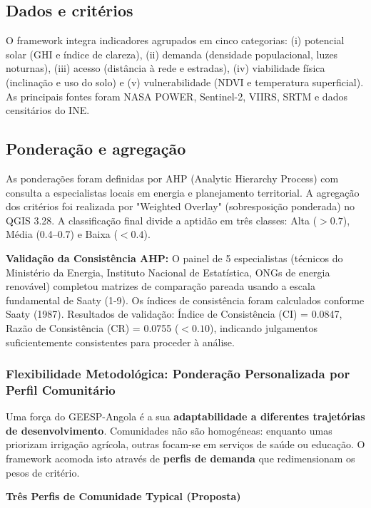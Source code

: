 \documentclass[12pt, a4paper]{article}
\begin{document}
\subsection{Dados e critérios}

O framework integra indicadores agrupados em cinco categorias: (i) potencial solar (GHI e índice de clareza), (ii) demanda (densidade populacional, luzes noturnas), (iii) acesso (distância à rede e estradas), (iv) viabilidade física (inclinação e uso do solo) e (v) vulnerabilidade (NDVI e temperatura superficial). As principais fontes foram NASA POWER, Sentinel-2, VIIRS, SRTM e dados censitários do INE.

\subsection{Ponderação e agregação}

As ponderações foram definidas por AHP (Analytic Hierarchy Process) com consulta a especialistas locais em energia e planejamento territorial. A agregação dos critérios foi realizada por "Weighted Overlay" (sobresposição ponderada) no QGIS 3.28. A classificação final divide a aptidão em três classes: Alta ($>0.7$), Média (0.4--0.7) e Baixa ($<0.4$).

\textbf{Validação da Consistência AHP:} O painel de 5 especialistas (técnicos do Ministério da Energia, Instituto Nacional de Estatística, ONGs de energia renovável) completou matrizes de comparação pareada usando a escala fundamental de Saaty (1-9). Os índices de consistência foram calculados conforme Saaty (1987). Resultados de validação: Índice de Consistência (CI) = 0.0847, Razão de Consistência (CR) = 0.0755 ($< 0.10$), indicando julgamentos suficientemente consistentes para proceder à análise.

\subsubsection{Flexibilidade Metodológica: Ponderação Personalizada por Perfil Comunitário}

Uma força do GEESP-Angola é a sua \textbf{adaptabilidade a diferentes trajetórias de 
desenvolvimento}. Comunidades não são homogéneas: enquanto umas priorizam irrigação 
agrícola, outras focam-se em serviços de saúde ou educação. O framework acomoda 
isto através de \textbf{perfis de demanda} que redimensionam os pesos de critério.

\textbf{Três Perfis de Comunidade Typical (Proposta)}
\end{document}
